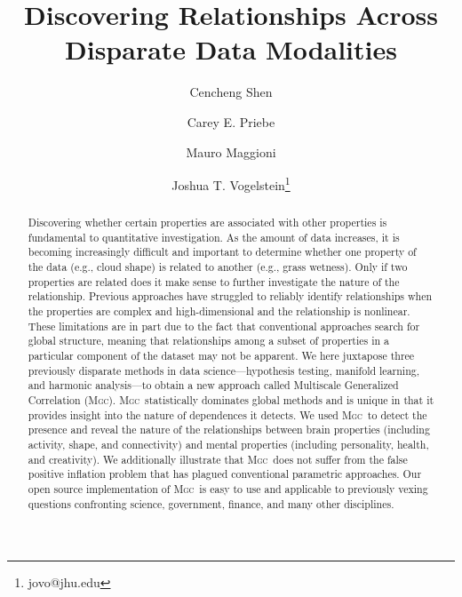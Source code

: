\documentclass[11pt]{article}
\providecommand{\sct}[1]{{\normalfont\textsc{#1}}}
\newcommand{\Mgc}{\sct{Mgc}}
\begin{document}
\def\spacingset#1{\renewcommand{\baselinestretch}%
{#1}\small\normalsize} \spacingset{1}

\title{\bf Discovering Relationships Across Disparate Data Modalities}
\author[1,2]{Cencheng Shen} %
\author[1,3]{Carey E. Priebe}%
\author[3,4,6]{Mauro Maggioni}%
\author[1,5,6,7]{Joshua T. Vogelstein\thanks{jovo@jhu.edu}}
\maketitle

\begin{abstract}
Discovering whether certain properties are associated with other properties is fundamental to quantitative investigation.
As the amount of data increases, it is becoming increasingly difficult and important to determine whether one property of the data (e.g., cloud shape) is related to another (e.g., grass wetness). Only if two properties are related does it make sense to further investigate the nature of the relationship. Previous approaches have struggled to reliably identify relationships when the properties are complex and high-dimensional and the relationship is nonlinear. 
These limitations are in part due to the fact that conventional approaches search for global structure, meaning that relationships among a subset of properties in a particular component of the dataset may not be apparent.
We here juxtapose three previously disparate methods in data science---hypothesis testing, manifold learning, and harmonic analysis---to obtain a new approach called Multiscale Generalized Correlation (\Mgc).  
\Mgc~statistically dominates global methods and is unique in that it provides insight into the nature of dependences it detects. 
We used \Mgc~to detect the presence and reveal the nature
of the relationships between brain properties (including activity, shape, and connectivity) 
and mental properties (including personality, health, and creativity). 
We additionally illustrate that \Mgc~does not suffer from the false positive inflation problem that has plagued conventional parametric approaches.  Our open source implementation of \Mgc~is easy to use and applicable to previously vexing questions confronting science, government, finance, and many other disciplines. 
\end{abstract}
\end{document}
